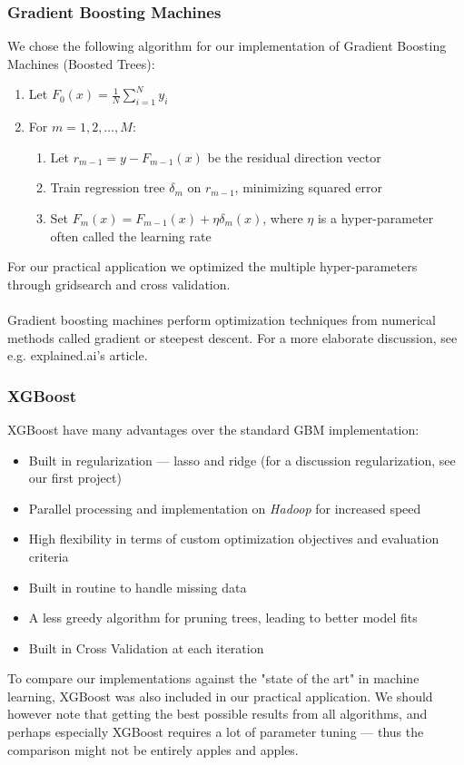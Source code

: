 \documentclass[10pt, a4paper, twocolumn]{article}
\begin{document}
			\subsubsection{Gradient Boosting Machines}
				We chose the following algorithm for our implementation of Gradient Boosting Machines (Boosted Trees):				
				\begin{enumerate}
					\item Let $F_0(x)=\frac{1}{N}\sum_{i=1}^N y_i$
					\item For $m=1,2,\dots, M$:
					\begin{enumerate}
						\item Let $r_{m-1}=y-F_{m-1}(x)$ be the residual direction vector
						\item Train regression tree $\delta_m$ on $r_{m-1}$, minimizing squared error
						\item Set $F_m(x) = F_{m-1}(x) + \eta\delta_m(x)$, where $\eta$ is a hyper-parameter often called the learning rate 
					\end{enumerate}
				\end{enumerate}
				For our practical application we optimized the multiple hyper-parameters through gridsearch and cross validation.\\\\
				Gradient boosting machines perform optimization techniques from numerical methods called gradient or steepest descent. For a more elaborate discussion, see e.g. explained.ai's article\cite{explAIproof}.
	
			\subsubsection{XGBoost}
			XGBoost have many advantages over the standard GBM implementation\cite{XGBoost}\cite{anavidhya}:
				\begin{itemize}
					\item Built in regularization --- lasso and ridge (for a discussion regularization, see our first project\cite{Project1})
					\item Parallel processing and implementation on \emph{Hadoop} for increased speed
					\item High flexibility in terms of custom optimization objectives and evaluation criteria
					\item Built in routine to handle missing data
					\item A less greedy algorithm for pruning trees, leading to better model fits
					\item Built in Cross Validation at each iteration
				\end{itemize}
			To compare our implementations against the "state of the art" in machine learning, XGBoost was also included in our practical application. We should however note that getting the best possible results from all algorithms, and perhaps especially XGBoost requires a lot of parameter tuning --- thus the comparison might not be entirely apples and apples.
\end{document}
